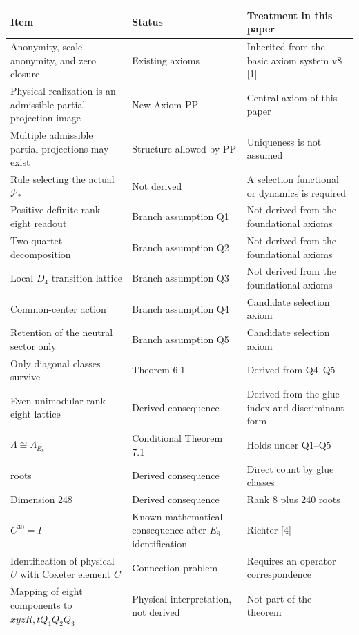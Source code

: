 \documentclass[
  a4paper,
]{article}
\newcounter{none} %
\begin{document}
{\def\LTcaptype{none} %
\begin{longtable}[]{@{}
  >{\raggedright\arraybackslash}p{}
  >{\raggedright\arraybackslash}p{}
  >{\raggedright\arraybackslash}p{}@{}}
\toprule\noalign{}
\begin{minipage}[b]{\linewidth}\raggedright
Item
\end{minipage} & \begin{minipage}[b]{\linewidth}\raggedright
Status
\end{minipage} & \begin{minipage}[b]{\linewidth}\raggedright
Treatment in this paper
\end{minipage} \\
\midrule\noalign{}
\endhead
\bottomrule\noalign{}
\endlastfoot
Anonymity, scale anonymity, and zero closure & Existing axioms &
Inherited from the basic axiom system v8 {[}1{]} \\
Physical realization is an admissible partial-projection image & New
Axiom PP & Central axiom of this paper \\
Multiple admissible partial projections may exist & Structure allowed by
PP & Uniqueness is not assumed \\
Rule selecting the actual \(\mathcal P_*\) & Not derived & A selection
functional or dynamics is required \\
Positive-definite rank-eight readout & Branch assumption Q1 & Not
derived from the foundational axioms \\
Two-quartet decomposition & Branch assumption Q2 & Not derived from the
foundational axioms \\
Local \(D_4\) transition lattice & Branch assumption Q3 & Not derived
from the foundational axioms \\
Common-center action & Branch assumption Q4 & Candidate selection
axiom \\
Retention of the neutral sector only & Branch assumption Q5 & Candidate
selection axiom \\
Only diagonal classes survive & Theorem 6.1 & Derived from Q4--Q5 \\
Even unimodular rank-eight lattice & Derived consequence & Derived from
the glue index and discriminant form \\
\(\Lambda\cong\Lambda_{E_8}\) & Conditional Theorem 7.1 & Holds under
Q1--Q5 \\
240 roots & Derived consequence & Direct count by glue classes \\
Dimension 248 & Derived consequence & Rank 8 plus 240 roots \\
\(C^{30}=I\) & Known mathematical consequence after \(E_8\)
identification & Richter {[}4{]} \\
Identification of physical \(U\) with Coxeter element \(C\) & Connection
problem & Requires an operator correspondence \\
Mapping of eight components to \(xyzR,tQ_1Q_2Q_3\) & Physical
interpretation, not derived & Not part of the theorem \\
\end{longtable}
}
\end{document}
